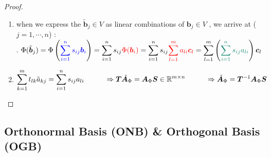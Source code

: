 \begin{enumerate}
\begin{proof}
\begin{enumerate}
            \item when we express the $\tilde{\bm{b}}_j \in V$ as linear combinations of $\bm{b}_j \in V$ , we arrive at ($j = 1,\cdots, n$) :
            \hfill \cite{mfml/book/mml/Deisenroth-Faisal-Ong}
            \\
            .\hfill
            $
                \Phi (\tilde{\bm{b}}_j )
                = \Phi  \dParenBrac{ \textcolor{blue}{\dsum ^n _{i=1} s_{ij} \bm{b}_i}}
                = \dsum ^n _{i=1} s_{ij} \textcolor{red}{\Phi (\bm{b}_i)}
                = \dsum^n _{i=1} s_{ij} \textcolor{red}{\dsum ^m _{l=1} a_{li} \bm{c}_l}
                = \dsum ^m _{l=1} \dParenBrac{ \textcolor{PineGreen}{\dsum^n _{i=1} s_{ij} a_{li}} } \bm{c}_l
            $
            \hfill \cite{mfml/book/mml/Deisenroth-Faisal-Ong}

            \item $
                \begin{aligned}
                    \displaystyle\sum^m_{k=1} t_{lk} \tilde{a}_{kj} = \displaystyle\sum^n _{i=1} s_{ij} a_{li}
                    \hspace{1cm}
                    \Rightarrow
                    \bm{T} \tilde{\bm{A}}_\Phi = \bm{A}_\Phi \bm{S}
                    \in \mathbb{R}^{m\times n}
                    \hspace{1cm}
                    \Rightarrow
                    \tilde{\bm{A}}_\Phi = \bm{T}^{-1} \bm{A}_\Phi \bm{S}
                \end{aligned}
            $
            \hfill \cite{mfml/book/mml/Deisenroth-Faisal-Ong}
        \end{enumerate}
    \end{proof}


\end{enumerate}






\subsection{Orthonormal Basis (ONB) \& Orthogonal Basis (OGB)}



